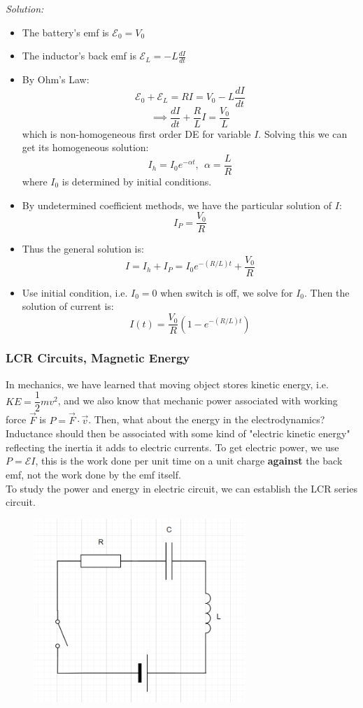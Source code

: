\documentclass[12pt,a4paper,twoside]{article}
\numberwithin{equation}{section}
\begin{document}
\noindent\textit{Solution:}
\begin{itemize}
    \item The battery's emf is $\mathcal{E}_0=V_0$
    \item The inductor's back emf is $\mathcal{E}_L=-L\frac{dI}{dt}$
    \item By Ohm's Law:
    \[\mathcal{E}_0+\mathcal{E}_L=RI=V_0-L\frac{dI}{dt}\]
    \[\implies \frac{dI}{dt}+\frac{R}{L}I=\frac{V_0}{L}\]
    which is non-homogeneous first order DE for variable $I$. Solving this we can get its homogeneous solution:
    \[I_h=I_0e^{-\alpha t},\ \ \alpha=\frac{L}{R}\]
    where $I_0$ is determined by initial conditions.
    
    \item By undetermined coefficient methods, we have the particular solution of $I$:
    \[I_P=\frac{V_0}{R}\]
    \item Thus the general solution is:
    \[I=I_h+I_P=I_0e^{-(R/L)t}+\frac{V_0}{R}\]
    \item Use initial condition, i.e. $I_0=0$ when switch is off, we solve for $I_0$. Then the solution of current is:
    \[I(t)=\frac{V_0}{R}\left(1-e^{-(R/L)t}\right)\]
\end{itemize}


\subsubsection{LCR Circuits, Magnetic Energy}
In mechanics, we have learned that moving object stores kinetic energy, i.e. $KE=\dfrac{1}{2}mv^2$, and we also know that mechanic power associated with working force $\overrightarrow{F}$ is $P=\overrightarrow{F}\cdot \overrightarrow{v}$. Then, what about the energy in the electrodynamics? Inductance should then be associated with some kind of "electric kinetic energy" reflecting the inertia it adds to electric currents. To get electric power, we use $P=\mathcal{E}I$, this is the work done per unit time on a unit charge \textbf{against} the back emf, not the work done by the emf itself.\\

\noindent To study the power and energy in electric circuit, we can establish the LCR series circuit.
\begin{figure}[ht]
    \centering
    \includegraphics[width=8cm]{250-Revision/LCR.png}
\end{figure}
\end{document}

